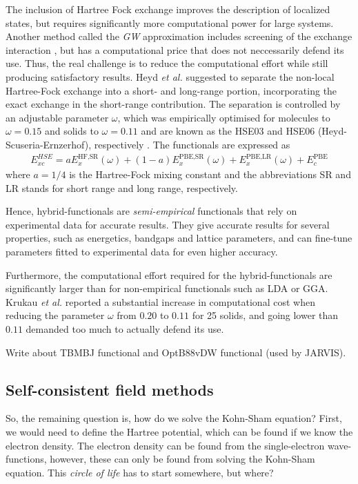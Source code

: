 The inclusion of Hartree Fock exchange improves the description of localized states, but requires significantly more computational power for large systems. Another method called the \textit{GW} approximation includes screening of the exchange interaction \cite{Aryasetiawan1998}, but has a computational price that does not neccessarily defend its use. Thus, the real challenge is to reduce the computational effort while still producing satisfactory results. Heyd \textit{et al.} \cite{Heyd2003} suggested to separate the non-local Hartree-Fock exchange into a short- and long-range portion, incorporating the exact exchange in the short-range contribution. The separation is controlled by an adjustable parameter $\omega$, which was empirically optimised for molecules to $\omega = 0.15$ and solids to $\omega = 0.11$ and are known as the HSE03 and HSE06 (Heyd-Scuseria-Ernzerhof), respectively \cite{Krukau2006}. The functionals are expressed as
\begin{align}
  E_{xc}^{HSE} = aE_{x}^{\text{HF,SR}}(\omega) + (1-a)E_x^{\text{PBE,SR}}(\omega) + E_x^{\text{PBE,LR}}(\omega) + E_c^{\text{PBE}}
\end{align}
where $a=1/4$ is the Hartree-Fock mixing constant and the abbreviations SR and LR stands for short range and long range, respectively.

Hence, hybrid-functionals are \textit{semi-empirical} functionals that rely on experimental data for accurate results. They give accurate results for several properties, such as energetics, bandgaps and lattice parameters, and can fine-tune parameters fitted to experimental data for even higher accuracy.

Furthermore, the computational effort required for the hybrid-functionals are significantly larger than for non-empirical functionals such as LDA or GGA. Krukau \textit{et al.} \cite{Krukau2006} reported a substantial increase in computational cost when reducing the parameter $\omega$ from $0.20$ to $0.11$ for 25 solids, and going lower than $0.11$ demanded too much  to actually defend its use.


Write about TBMBJ functional and OptB88vDW functional (used by JARVIS).

\subsection{Self-consistent field methods}

So, the remaining question is, how do we solve the Kohn-Sham equation? First, we would need to define the Hartree potential, which can be found if we know the electron density. The electron density can be found from the single-electron wave-functions, however, these can only be found from solving the Kohn-Sham equation. This \textit{circle of life} has to start somewhere, but where?

